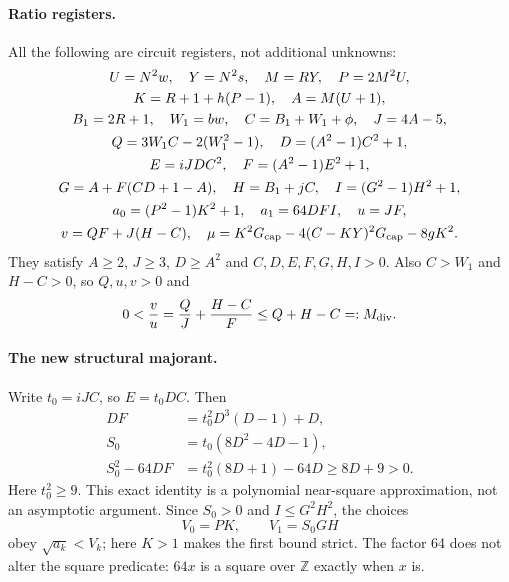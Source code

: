 \paragraph{Ratio registers.}
All the following are circuit registers, not additional unknowns:
\begin{gather*}
 U=N^2w,\quad Y=N^2s,\quad M=RY,\quad P=2M^2U,\\
 K=R+1+h(P-1),\quad A=M(U+1),\\
 B_1=2R+1,\quad W_1=bw,\quad C=B_1+W_1+\phi,\quad J=4A-5,\\
 Q=3W_1C-2(W_1^2-1),\quad D=(A^2-1)C^2+1,\\
 E=iJDC^2,\quad F=(A^2-1)E^2+1,\\
 G=A+F(CD+1-A),\quad H=B_1+jC,\quad I=(G^2-1)H^2+1,\\
 a_0=(P^2-1)K^2+1,\quad a_1=64DFI,\quad u=JF,\\
 v=QF+J(H-C),\quad
 \mu=K^2G_{\rm cap}-4(C-KY)^2G_{\rm cap}-8gK^2.
\end{gather*}
They satisfy $A\geq2$, $J\geq3$, $D\geq A^2$ and
$C,D,E,F,G,H,I>0$. Also $C>W_1$ and $H-C>0$, so $Q,u,v>0$ and
\[
 0<\frac vu=\frac QJ+\frac{H-C}{F}\leq Q+H-C=:M_{\rm div}.
\]

\paragraph{The new structural majorant.}
Write $t_0=iJC$, so $E=t_0DC$. Then
\begin{align*}
 DF&=t_0^2D^3(D-1)+D,\\
 S_0&=t_0(8D^2-4D-1),\\
 S_0^2-64DF&=t_0^2(8D+1)-64D\geq8D+9>0.
\end{align*}
Here $t_0^2\geq9$. This exact identity is a polynomial near-square
approximation, not an asymptotic argument. Since $S_0>0$ and
$I\leq G^2H^2$, the choices
\[
 V_0=PK,\qquad V_1=S_0GH
\]
obey $\sqrt{a_k}<V_k$; here $K>1$ makes the first bound strict. The factor 64 does not alter the
square predicate: $64x$ is a square over $\mathbb Z$ exactly when $x$ is.

